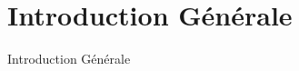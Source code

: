 \chapter*{Introduction Générale}
\thispagestyle{plain}
\pagestyle{plain}
\markboth{}{}

Introduction Générale


\newpage

